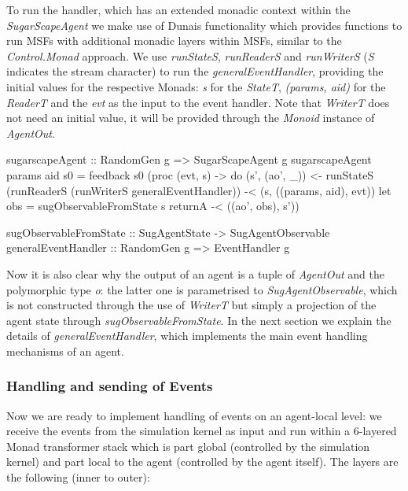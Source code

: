 To run the handler, which has an extended monadic context within the \textit{SugarScapeAgent} we make use of Dunais functionality which provides functions to run MSFs with additional monadic layers within MSFs, similar to the \textit{Control.Monad} approach. We use \textit{runStateS}, \textit{runReaderS} and \textit{runWriterS} (\textit{S} indicates the stream character) to run the \textit{generalEventHandler}, providing the initial values for the respective Monads: \textit{s} for the \textit{StateT}, \textit{(params, aid)} for the \textit{ReaderT} and the \textit{evt} as the input to the event handler. Note that \textit{WriterT} does not need an initial value, it will be provided through the \textit{Monoid} instance of \textit{AgentOut}.

\begin{HaskellCode}
sugarscapeAgent :: RandomGen g => SugarScapeAgent g
sugarscapeAgent params aid s0 = feedback s0 (proc (evt, s) -> do
  (s', (ao', _)) <- runStateS 
                      (runReaderS 
                        (runWriterS generalEventHandler)) -< (s, ((params, aid), evt))
  let obs = sugObservableFromState s
  returnA -< ((ao', obs), s'))

sugObservableFromState :: SugAgentState -> SugAgentObservable
generalEventHandler :: RandomGen g => EventHandler g
\end{HaskellCode}

Now it is also clear why the output of an agent is a tuple of \textit{AgentOut} and the polymorphic type \textit{o}: the latter one is parametrised to \textit{SugAgentObservable}, which is not constructed through the use of \textit{WriterT} but simply a projection of the agent state through \textit{sugObservableFromState}. In the next section we explain the details of \textit{generalEventHandler}, which implements the main event handling mechanisms of an agent.

\subsubsection{Handling and sending of Events}
Now we are ready to implement handling of events on an agent-local level: we receive the events from the simulation kernel as input and run within a 6-layered Monad transformer stack which is part global (controlled by the simulation kernel) and part local to the agent (controlled by the agent itself). The layers are the following (inner to outer):

